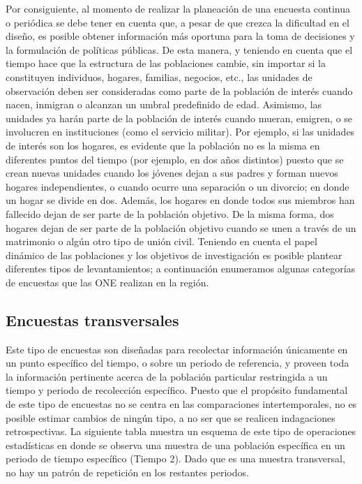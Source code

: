 \documentclass[
  10pt,
  spanish,
]{book}
\begin{document}
Por consiguiente, al momento de realizar la planeación de una encuesta continua o periódica se debe tener en cuenta que, a pesar de que crezca la dificultad en el diseño, es posible obtener información más oportuna para la toma de decisiones y la formulación de políticas públicas. De esta manera, y teniendo en cuenta que el tiempo hace que la estructura de las poblaciones cambie, sin importar si la constituyen individuos, hogares, familias, negocios, etc., las unidades de observación deben ser consideradas como parte de la población de interés cuando nacen, inmigran o alcanzan un umbral predefinido de edad. Asimismo, las unidades ya harán parte de la población de interés cuando mueran, emigren, o se involucren en instituciones (como el servicio militar). Por ejemplo, si las unidades de interés son los hogares, es evidente que la población no es la misma en diferentes puntos del tiempo (por ejemplo, en dos años distintos) puesto que se crean nuevas unidades cuando los jóvenes dejan a sus padres y forman nuevos hogares independientes, o cuando ocurre una separación o un divorcio; en donde un hogar se divide en dos. Además, los hogares en donde todos sus miembros han fallecido dejan de ser parte de la población objetivo. De la misma forma, dos hogares dejan de ser parte de la población objetivo cuando se unen a través de un matrimonio o algún otro tipo de unión civil. Teniendo en cuenta el papel dinámico de las poblaciones y los objetivos de investigación es posible plantear diferentes tipos de levantamientos; a continuación enumeramos algunas categorías de encuestas que las ONE realizan en la región.

\hypertarget{encuestas-transversales}{%
\subsection{Encuestas transversales}\label{encuestas-transversales}}

Este tipo de encuestas son diseñadas para recolectar información únicamente en un punto específico del tiempo, o sobre un periodo de referencia, y proveen toda la información pertinente acerca de la población particular restringida a un tiempo y periodo de recolección específico. Puesto que el propósito fundamental de este tipo de encuestas no se centra en las comparaciones intertemporales, no es posible estimar cambios de ningún tipo, a no ser que se realicen indagaciones retrospectivas. La siguiente tabla muestra un esquema de este tipo de operaciones estadísticas en donde se observa una muestra de una población específica en un periodo de tiempo específico (Tiempo 2). Dado que es una muestra transversal, no hay un patrón de repetición en los restantes periodos.
\end{document}
